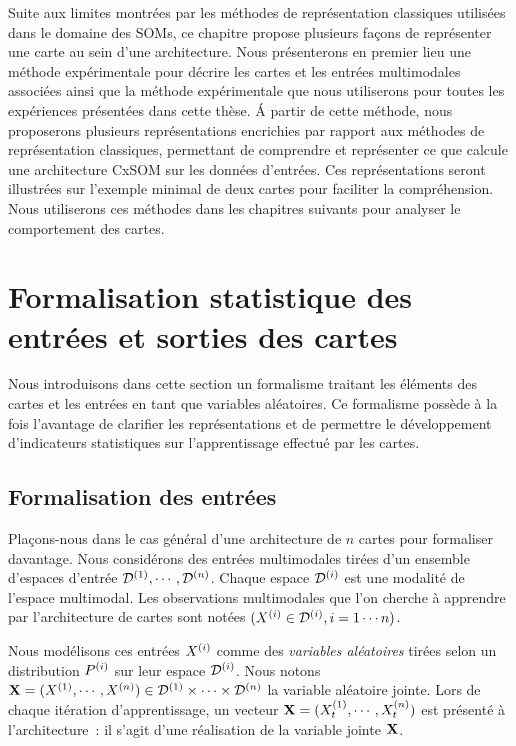 \documentclass[../main]{subfiles}
\begin{document}
Suite aux limites montrées par les méthodes de représentation classiques utilisées dans le domaine des SOMs, ce chapitre propose plusieurs façons de représenter une carte au sein d'une architecture.
Nous présenterons en premier lieu une méthode expérimentale pour décrire les cartes et les entrées multimodales associées ainsi que la méthode expérimentale que nous utiliserons pour toutes les expériences présentées dans cette thèse. 
\'A partir de cette méthode, nous proposerons plusieurs représentations encrichies par rapport aux méthodes de représentation classiques, permettant de comprendre et représenter ce que calcule une architecture CxSOM sur les données d'entrées. Ces représentations seront illustrées sur l'exemple minimal de deux cartes pour faciliter la compréhension. 
Nous utiliserons ces méthodes dans les chapitres suivants pour analyser le comportement des cartes.

\section{Formalisation statistique des entrées et sorties des cartes}

Nous introduisons dans cette section un formalisme traitant les éléments des cartes et les entrées en tant que variables aléatoires. 
Ce formalisme possède à la fois l'avantage de clarifier les représentations et de permettre le développement d'indicateurs statistiques sur l'apprentissage effectué par les cartes.

\subsection{Formalisation des entrées}

Plaçons-nous dans le cas général d'une architecture de $n$ cartes pour formaliser davantage.
Nous considérons des entrées multimodales tirées d'un ensemble d'espaces d'entrée $\mathcal{D}^{({1})},\cdots,\mathcal{D}^{({n})}$. Chaque espace $\mathcal{D}^{({i})}$ est une modalité de l'espace multimodal.
Les observations multimodales que l'on cherche à apprendre par l'architecture de cartes sont notées $(X^{({i})} \in \mathcal{D}^{({i})}, i = 1 \cdots n)$.

Nous modélisons ces entrées $X^{({i})}$ comme des \emph{variables aléatoires} tirées selon un distribution $P^{({i})}$ sur leur espace $\mathcal{D}^{({i})}$.
Nous notons $\mathbf{X} = (X^{({1})}, \cdots, X^{({n})}) \in \mathcal{D}^{({1})} \times \cdots \times \mathcal{D}^{({n})}$ la variable aléatoire jointe. 
Lors de chaque itération d'apprentissage, un vecteur $\mathbf{X} = (X^{({1})}_t, \cdots , X^{({n})}_t)$ est présenté à l'architecture~: il s'agit d'une réalisation de la variable jointe $\mathbf{X}$. 
\end{document}
